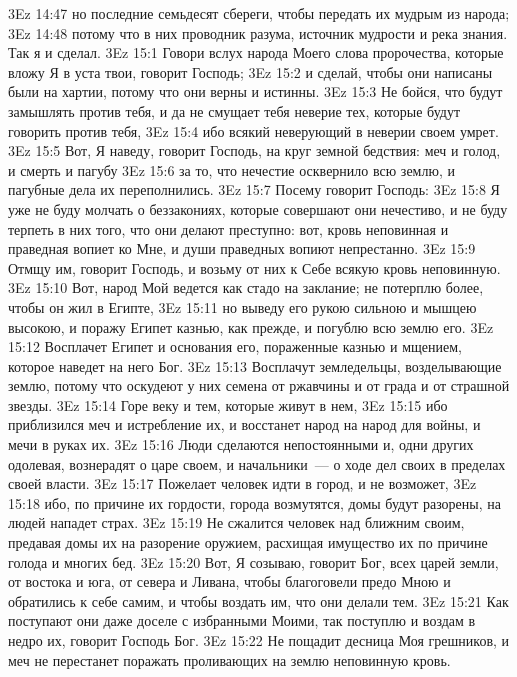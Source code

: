 \vs 3Ez 14:47 но последние семьдесят сбереги, чтобы передать их мудрым из народа;
\vs 3Ez 14:48 потому что в них проводник разума, источник мудрости и река знания. Так я и сделал.
\vs 3Ez 15:1 Говори вслух народа Моего слова пророчества, которые вложу Я в уста твои, говорит Господь;
\vs 3Ez 15:2 и сделай, чтобы они написаны были на хартии, потому что они верны и истинны.
\vs 3Ez 15:3 Не бойся, что будут замышлять против тебя, и да не смущает тебя неверие тех, которые будут говорить против тебя,
\vs 3Ez 15:4 ибо всякий неверующий в неверии своем умрет.
\vs 3Ez 15:5 Вот, Я наведу, говорит Господь, на круг земной бедствия: меч и голод, и смерть и пагубу
\vs 3Ez 15:6 за то, что нечестие  осквернило всю землю, и пагубные дела их переполнились.
\vs 3Ez 15:7 Посему говорит Господь:
\vs 3Ez 15:8 Я уже не буду молчать о беззакониях, которые совершают они нечестиво, и не буду терпеть в них того, что они делают преступно: вот, кровь неповинная и праведная вопиет ко Мне, и души праведных вопиют непрестанно.
\vs 3Ez 15:9 Отмщу им, говорит Господь, и возьму от них к Себе всякую кровь неповинную.
\vs 3Ez 15:10 Вот, народ Мой ведется как стадо на заклание; не потерплю более, чтобы он жил в Египте,
\vs 3Ez 15:11 но выведу его рукою сильною и мышцею высокою, и поражу Египет казнью, как прежде, и погублю всю землю его.
\vs 3Ez 15:12 Восплачет Египет и основания его, пораженные казнью и мщением, которое наведет на него Бог.
\vs 3Ez 15:13 Восплачут земледельцы, возделывающие землю, потому что оскудеют у них семена от ржавчины и от града и от страшной звезды.
\vs 3Ez 15:14 Горе веку и тем, которые живут в нем,
\vs 3Ez 15:15 ибо приблизился меч и истребление их, и восстанет народ на народ для войны, и мечи в руках их.
\vs 3Ez 15:16 Люди сделаются непостоянными и, одни других одолевая, вознерадят о царе своем, и начальники~--- о ходе дел своих в пределах своей власти.
\vs 3Ez 15:17 Пожелает человек идти в город, и не возможет,
\vs 3Ez 15:18 ибо, по причине их гордости, города возмутятся, домы будут разорены, на людей нападет страх.
\vs 3Ez 15:19 Не сжалится человек над ближним своим, предавая домы их на разорение оружием, расхищая имущество их по причине голода и многих бед.
\vs 3Ez 15:20 Вот, Я созываю, говорит Бог, всех царей земли, от востока и юга, от севера и Ливана, чтобы благоговели предо Мною и обратились к себе самим, и чтобы воздать им, что они делали тем.
\vs 3Ez 15:21 Как поступают они даже доселе с избранными Моими, так поступлю  и воздам в недро их, говорит Господь Бог.
\vs 3Ez 15:22 Не пощадит десница Моя грешников, и меч не перестанет поражать проливающих на землю неповинную кровь.
